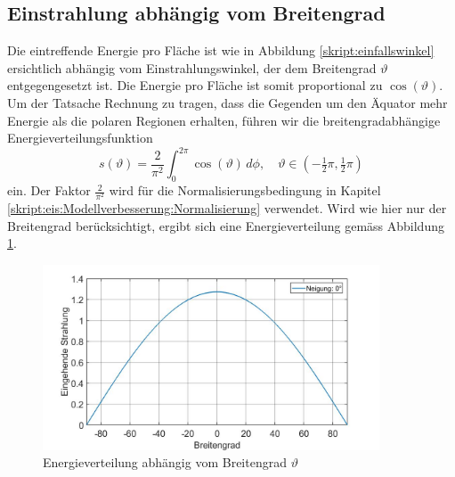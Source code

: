 \begin{refsection}
\subsection{Einstrahlung abhängig vom Breitengrad}
Die eintreffende Energie pro Fläche ist wie in Abbildung \ref{skript:einfallswinkel} ersichtlich abhängig vom Einstrahlungswinkel, der dem Breitengrad $\vartheta$ entgegengesetzt ist. Die Energie pro Fläche ist somit proportional zu $\cos(\vartheta)$. Um der Tatsache Rechnung zu tragen, dass die Gegenden um den Äquator mehr Energie als die polaren Regionen erhalten, führen wir die breitengradabhängige Energieverteilungsfunktion
\begin{equation}\label{skript:eis:Energieverteilung Breitengrad}
s(\vartheta)
=
\frac{2}{\pi^2}\int_{0}^{2\pi}\cos(\vartheta)\,d\phi,\quad
\vartheta\in(-\tfrac{1}{2}\pi,\tfrac{1}{2}\pi)
\end{equation}
ein. Der Faktor $\frac{2}{\pi^2}$ wird für die Normalisierungsbedingung in Kapitel \ref{skript:eis:Modellverbesserung:Normalisierung} verwendet. Wird wie hier nur der Breitengrad berücksichtigt, ergibt sich eine Energieverteilung gemäss Abbildung \ref{skript:eis:fig:Einstrahlung_abh_vom_Breitengrad}.
\begin{figure}
 	\centering
 	\includegraphics[width=10cm]{eis/Einstrahlung_abh_vom_Breitengrad.jpg}
 	\caption{Energieverteilung abhängig vom Breitengrad $\vartheta$}
 	\label{skript:eis:fig:Einstrahlung_abh_vom_Breitengrad}
\end{figure}

\end{refsection}
